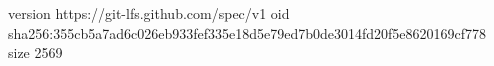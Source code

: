 version https://git-lfs.github.com/spec/v1
oid sha256:355cb5a7ad6c026eb933fef335e18d5e79ed7b0de3014fd20f5e8620169cf778
size 2569
